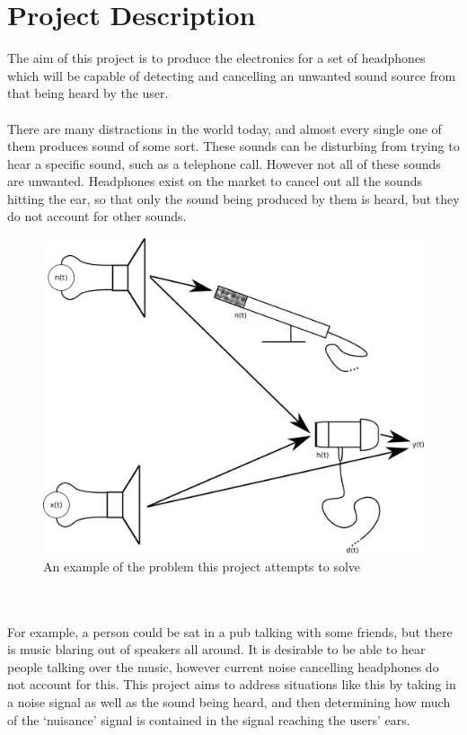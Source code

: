 \section{Project Description}
The aim of this project is to produce the electronics for a set of headphones which will be capable of detecting and cancelling an unwanted sound source from that being heard by the user.
\\
\\
There are many distractions in the world today, and almost every single one of them produces sound of some sort.
These sounds can be disturbing from trying to hear a specific sound, such as a telephone call.
However not all of these sounds are unwanted.
Headphones exist on the market to cancel out all the sounds hitting the ear, so that only the sound being produced by them is heard, but they do not account for other sounds.
\begin{figure}
	\centering
	\includegraphics[width=\textwidth]{./img/projdescript.png}
	\caption{An example of the problem this project attempts to solve}
	\label{fig:projdescript}
\end{figure}
\\
\\
For example, a person could be sat in a pub talking with some friends, but there is music blaring out of speakers all around.
It is desirable to be able to hear people talking over the music, however current noise cancelling headphones do not account for this.
This project aims to address situations like this by taking in a noise signal as well as the sound being heard, and then determining how much of the `nuisance' signal is contained in the signal reaching the users' ears.

